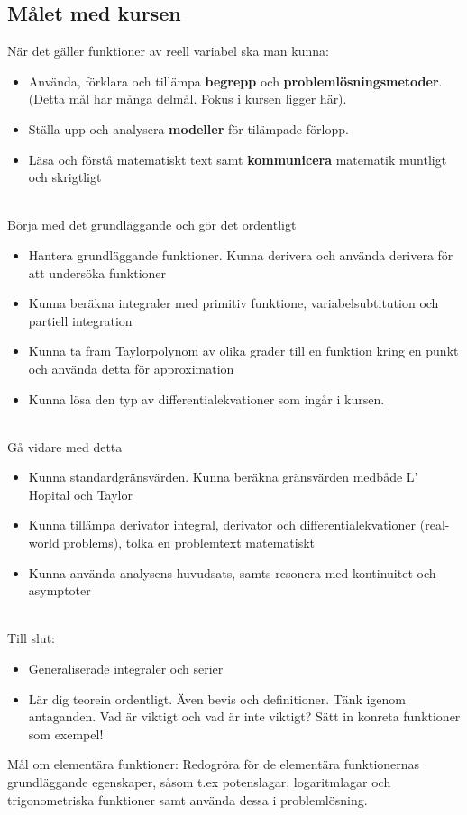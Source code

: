 \documentclass{report}
\begin{document}
\subsection{Målet med kursen}
När det gäller funktioner av reell variabel ska man kunna:\\
\begin{itemize}
	\item Använda, förklara och tillämpa \textbf{begrepp} och \textbf{problemlösningsmetoder}. (Detta mål har många delmål. Fokus i kursen ligger här).
	\item Ställa upp och analysera \textbf{modeller} för tilämpade förlopp.
	\item Läsa och förstå matematiskt text samt \textbf{kommunicera} matematik muntligt och skrigtligt
\end{itemize}

\dotfill\\
Börja med det grundläggande och gör det ordentligt
\begin{itemize}
	\item Hantera grundläggande funktioner. Kunna derivera och använda derivera för att undersöka funktioner
	\item Kunna beräkna integraler med primitiv funktione, variabelsubtitution och partiell integration
	\item Kunna ta fram Taylorpolynom av olika grader till en funktion kring en punkt och använda detta för approximation
	\item Kunna lösa den typ av differentialekvationer som ingår i kursen.
\end{itemize}

\dotfill\\
Gå vidare med detta
\begin{itemize}
	\item Kunna standardgränsvärden. Kunna beräkna gränsvärden medbåde L' Hopital och Taylor
	\item Kunna tillämpa derivator integral, derivator och differentialekvationer (real-world problems), tolka en problemtext matematiskt
	\item Kunna använda analysens huvudsats, samts resonera med kontinuitet och asymptoter
\end{itemize}
\dotfill\\
Till slut:
\begin{itemize}
	\item Generaliserade integraler och serier
	\item Lär dig teorein ordentligt. Även bevis och definitioner. Tänk igenom antaganden. Vad är viktigt och vad är inte viktigt? Sätt in konreta funktioner som exempel!
\end{itemize}
\noindent
Mål om elementära funktioner: Redogröra för de elementära funktionernas grundläggande egenskaper, såsom t.ex potenslagar, logaritmlagar och trigonometriska funktioner samt använda dessa i problemlösning.\\\\
\end{document}

